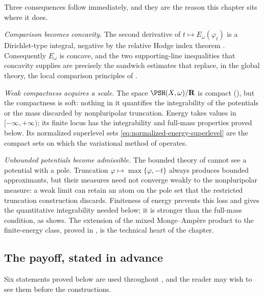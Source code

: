 Three consequences follow immediately, and they are the reason this chapter
sits where it does.

\emph{Comparison becomes concavity.}  The second derivative of
$t\mapsto E_\omega(\varphi_t)$ is a Dirichlet-type integral, negative by
the relative Hodge index theorem .  Consequently
$E_\omega$ is concave, and the two supporting-line inequalities that
concavity supplies are precisely the sandwich estimates that replace, in the
global theory, the local comparison principles of .

\emph{Weak compactness acquires a scale.}  The space
$\PSH(X,\omega)/\mathbf R$ is compact
(), but the compactness is soft: nothing in it
quantifies the integrability of the potentials or the mass discarded by
nonpluripolar truncation.  Energy takes values in $[-\infty,+\infty)$;
its finite locus has the integrability and full-mass properties proved below.
Its normalized
superlevel sets \eqref{eq:normalized-energy-superlevel} are the compact sets
on which the variational method of
 operates.

\emph{Unbounded potentials become admissible.}  The bounded theory of
 cannot see a potential with a pole.  Truncation
$\varphi\mapsto\max\{\varphi,-t\}$ always produces bounded approximants, but
their measures need not converge weakly to the nonpluripolar measure:
a weak limit can retain an atom on the pole set that the restricted
truncation construction discards.  Finiteness of energy prevents this loss
and gives the quantitative integrability needed below; it is stronger than
the full-mass condition, as
 shows.  The extension of the mixed
Monge--Amp\`ere product to the finite-energy class, proved in
, is the technical heart of the chapter.

\subsection{The payoff, stated in advance}
\label{sec:ch26-payoff}

Six statements proved below are used throughout
, and the reader may
wish to see them before the constructions.

